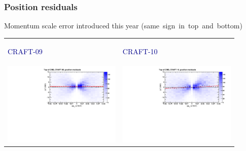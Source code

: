 \documentclass[compress]{beamer}
\begin{document}
\begin{frame}
\frametitle{Position residuals}

Momentum scale error introduced this year \mbox{(same sign in top and bottom)\hspace{-1 cm}}

\vspace{-0.5 cm}
\begin{tabular}{p{0.45\linewidth} p{0.45\linewidth}}
\begin{center} \large \textcolor{darkblue}{CRAFT-09} \end{center} & \begin{center} \large \textcolor{darkblue}{CRAFT-10} \end{center} \\
\includegraphics[width=\linewidth]{bfield_x_craft09_top.pdf} & \includegraphics[width=\linewidth]{bfield_x_craft10_top.pdf} \\

\end{tabular}
\end{frame}
\end{document}
